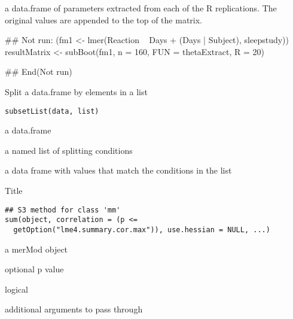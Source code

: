 \documentclass[letterpaper]{book}
\begin{document}
%
\begin{Value}
a data.frame of parameters extracted from each of the R replications.
The original values are appended to the top of the matrix.
\end{Value}
%
\begin{Examples}
\begin{ExampleCode}
## Not run: 
(fm1 <- lmer(Reaction ~ Days + (Days | Subject), sleepstudy))
resultMatrix <- subBoot(fm1, n = 160, FUN = thetaExtract, R = 20)

## End(Not run)
\end{ExampleCode}
\end{Examples}
%
\begin{Description}\relax
Split a data.frame by elements in a list
\end{Description}
%
\begin{Usage}
\begin{verbatim}
subsetList(data, list)
\end{verbatim}
\end{Usage}
%
\begin{Arguments}
\begin{ldescription}
\item[\code{data}] a data.frame

\item[\code{list}] a named list of splitting conditions
\end{ldescription}
\end{Arguments}
%
\begin{Value}
a data frame with values that match the conditions in the list
\end{Value}
%
\begin{Description}\relax
Title
\end{Description}
%
\begin{Usage}
\begin{verbatim}
## S3 method for class 'mm'
sum(object, correlation = (p <=
  getOption("lme4.summary.cor.max")), use.hessian = NULL, ...)
\end{verbatim}
\end{Usage}
%
\begin{Arguments}
\begin{ldescription}
\item[\code{object}] a merMod object

\item[\code{correlation}] optional p value

\item[\code{use.hessian}] logical

\item[\code{...}] additional arguments to pass through
\end{ldescription}
\end{Arguments}
\end{document}
